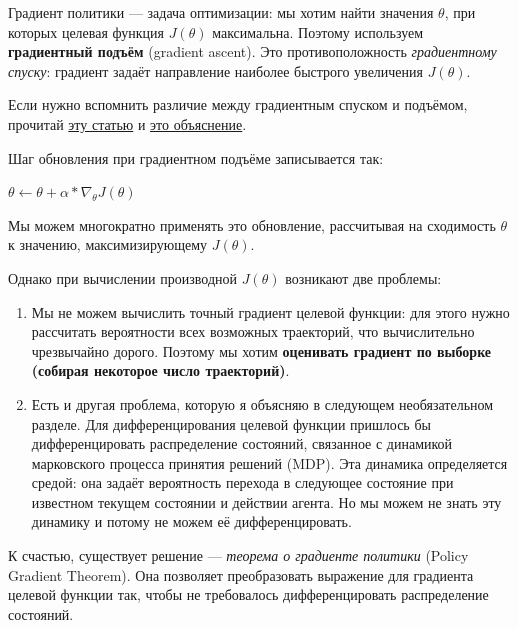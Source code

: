 \documentclass[11pt,a4paper]{article}
\begin{document}
Градиент политики --- задача оптимизации: мы хотим найти значения \(\theta\), при которых целевая функция \(J(\theta)\) максимальна. Поэтому используем \textbf{градиентный подъём} (gradient ascent). Это противоположность \emph{градиентному спуску}: градиент задаёт направление наиболее быстрого увеличения \(J(\theta)\).

Если нужно вспомнить различие между градиентным спуском и подъёмом, прочитай \href{https://www.baeldung.com/cs/gradient-descent-vs-ascent}{эту статью} и \href{https://stats.stackexchange.com/questions/258721/gradient-ascent-vs-gradient-descent-in-logistic-regression}{это объяснение}.

Шаг обновления при градиентном подъёме записывается так:

\(\theta \leftarrow \theta + \alpha *  \nabla_\theta J(\theta)\)

Мы можем многократно применять это обновление, рассчитывая на сходимость \(\theta\) к значению, максимизирующему \(J(\theta)\).

Однако при вычислении производной \(J(\theta)\) возникают две проблемы:

\begin{enumerate}
\def\labelenumi{\arabic{enumi}.}
\item
  Мы не можем вычислить точный градиент целевой функции: для этого нужно рассчитать вероятности всех возможных траекторий, что вычислительно чрезвычайно дорого. Поэтому мы хотим \textbf{оценивать градиент по выборке (собирая некоторое число траекторий)}.
\item
  Есть и другая проблема, которую я объясняю в следующем необязательном разделе. Для дифференцирования целевой функции пришлось бы дифференцировать распределение состояний, связанное с динамикой марковского процесса принятия решений (MDP). Эта динамика определяется средой: она задаёт вероятность перехода в следующее состояние при известном текущем состоянии и действии агента. Но мы можем не знать эту динамику и потому не можем её дифференцировать.
\end{enumerate}


К счастью, существует решение --- \emph{теорема о градиенте политики} (Policy Gradient Theorem). Она позволяет преобразовать выражение для градиента целевой функции так, чтобы не требовалось дифференцировать распределение состояний.
\end{document}

